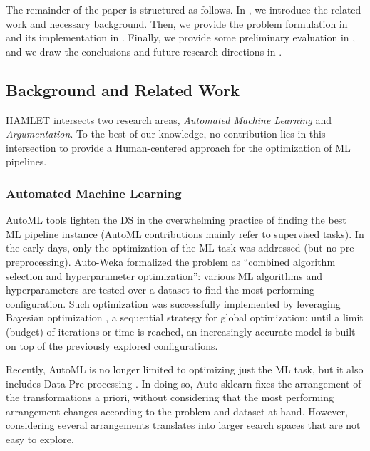 The remainder of the paper is structured as follows. In , we introduce the related work and necessary background. Then, we provide the problem formulation in  and its implementation in .
Finally, we provide some preliminary evaluation in , and we draw the conclusions and future research directions in .

\subsection{Background and Related Work}\label{ssec:related}
HAMLET intersects two research areas, \emph{Automated Machine Learning} and \emph{Argumentation}. 
To the best of our knowledge, no contribution lies in this intersection to provide a Human-centered approach for the optimization of ML pipelines.

\subsubsection{Automated Machine Learning}
AutoML tools lighten the DS in the overwhelming practice of finding the best ML pipeline instance (AutoML contributions mainly refer to supervised tasks).
In the early days, only the optimization of the ML task was addressed (but no pre-preprocessing).
Auto-Weka \cite{kotthoff2019auto} formalized the problem as ``combined algorithm selection and hyperparameter optimization'': various ML algorithms and hyperparameters are tested over a dataset to find the most performing configuration. Such optimization was successfully implemented by leveraging Bayesian optimization \cite{frazier2018tutorial}, a sequential strategy for global optimization: until a limit (budget) of iterations or time is reached, an increasingly accurate model is built on top of the previously explored configurations.

Recently, AutoML is no longer limited to optimizing just the ML task, but it also includes Data Pre-processing \cite{Giovanelli2021DOLAP, Quemy19DOLAP}.
In doing so, Auto-sklearn \cite{feurer2019auto} fixes the arrangement of the transformations a priori, without considering that the most performing arrangement changes according to the problem and dataset at hand.
However, considering several arrangements translates into larger search spaces that are not easy to explore.

